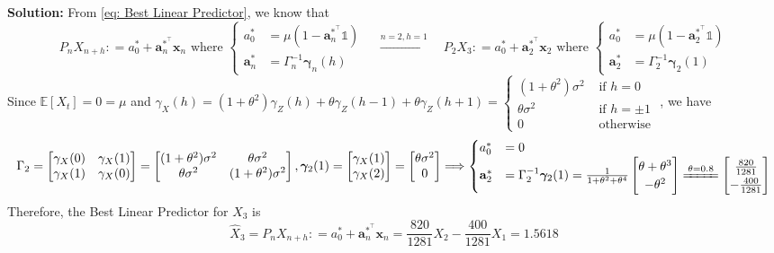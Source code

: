 \documentclass[11pt]{article}
\theoremstyle{plain} %
\newenvironment{solution}
{\color{C2}\normalfont\begin{framed}\begingroup\textbf{Solution:} }
  {\endgroup\end{framed}}
\theoremstyle{remark}
\newcommand{\bOne}{\mathds{1}}
\newcommand{\EE}{\mathbb{E}}
\begin{document}
\begin{solution}
  From \cref{eq: Best Linear Predictor}, we know that
  $$
    P_n X_{n+h} : = a_0^* + \mathbf{a}_n^{*^\top} \mathbf{x}_n \text{ where }
    \begin{cases}
      a_0^*          & = \mu(1-\mathbf{a}_n^{*^\top}\bOne) \\
      \mathbf{a}_n^* & = \Gamma_n^{-1}\bm{\gamma}_n(h)
    \end{cases}
    \quad \xrightarrow{n=2, h=1} \quad
    P_2 X_{3} : = a_0^* + \mathbf{a}_2^{*^\top} \mathbf{x}_2 \text{ where }
    \begin{cases}
      a_0^*          & = \mu(1-\mathbf{a}_2^{*^\top}\bOne) \\
      \mathbf{a}_2^* & = \Gamma_2^{-1}\bm{\gamma}_2(1)
    \end{cases}
  $$
  Since $\EE[X_t] = 0 = \mu$ and $\gamma_X(h) = (1+\theta^2)\gamma_Z(h) + \theta\gamma_Z(h-1) + \theta\gamma_Z(h+1) = \begin{cases}
      (1+\theta^2)\sigma^2 & \text{ if } h = 0     \\
      \theta\sigma^2       & \text{ if } h = \pm 1 \\
      0                    & \text{ otherwise }
    \end{cases}$, we have
  $$
    \Gamma_2 = \begin{bmatrix}
      \gamma_X(0) & \gamma_X(1) \\
      \gamma_X(1) & \gamma_X(0)
    \end{bmatrix} = \begin{bmatrix}
      (1+\theta^2)\sigma^2 & \theta\sigma^2       \\
      \theta\sigma^2       & (1+\theta^2)\sigma^2
    \end{bmatrix},
    \bm{\gamma}_2(1) = \begin{bmatrix}
      \gamma_X(1) \\
      \gamma_X(2)
    \end{bmatrix} = \begin{bmatrix}
      \theta\sigma^2 \\
      0
    \end{bmatrix}
    \Longrightarrow
    \begin{cases}
      a_0^*          & = 0                             \\
      \mathbf{a}_2^* & = \Gamma_2^{-1}\bm{\gamma}_2(1)
      = \frac{1}{1+\theta^2 + \theta^4}
      \begin{bmatrix}
        \theta + \theta^3 \\
        -\theta^2
      \end{bmatrix} \xlongequal{\theta = 0.8}
      \begin{bmatrix}
        \frac{820}{1281} \\
        -\frac{400}{1281}
      \end{bmatrix}
    \end{cases}
  $$
  Therefore, the Best Linear Predictor for $X_3$ is
  $$
    \hat{X}_3 = P_n X_{n+h} : = a_0^* + \mathbf{a}_n^{*^\top} \mathbf{x}_n = \frac{820}{1281}X_2 -\frac{400}{1281}X_1 = 1.5618
  $$


\end{solution}
\end{document}

